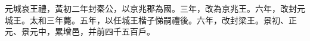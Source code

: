 
\begin{pinyinscope}
元城哀王禮，黃初二年封秦公，以京兆郡為國。三年，改為京兆王。六年，改封元城王。太和三年薨。五年，以任城王楷子悌嗣禮後。六年，改封梁王。景初、正元、景元中，累增邑，并前四千五百戶。


\end{pinyinscope}